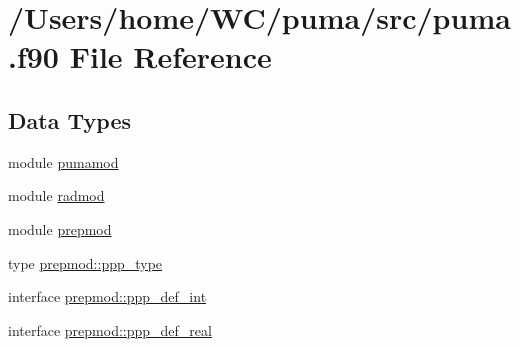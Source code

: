 \hypertarget{puma_8f90}{
\section{/\-Users/home/\-W\-C/puma/src/puma.f90 \-File \-Reference}
\label{puma_8f90}
}
\subsection*{\-Data \-Types}
\begin{DoxyCompactItemize}
\item 
module \hyperlink{classpumamod}{pumamod}
\item 
module \hyperlink{classradmod}{radmod}
\item 
module \hyperlink{classprepmod}{prepmod}
\item 
type \hyperlink{structprepmod_1_1ppp__type}{prepmod\-::ppp\-\_\-type}
\item 
interface \hyperlink{interfaceprepmod_1_1ppp__def__int}{prepmod\-::ppp\-\_\-def\-\_\-int}
\item 
interface \hyperlink{interfaceprepmod_1_1ppp__def__real}{prepmod\-::ppp\-\_\-def\-\_\-real}
\end{DoxyCompactItemize}
